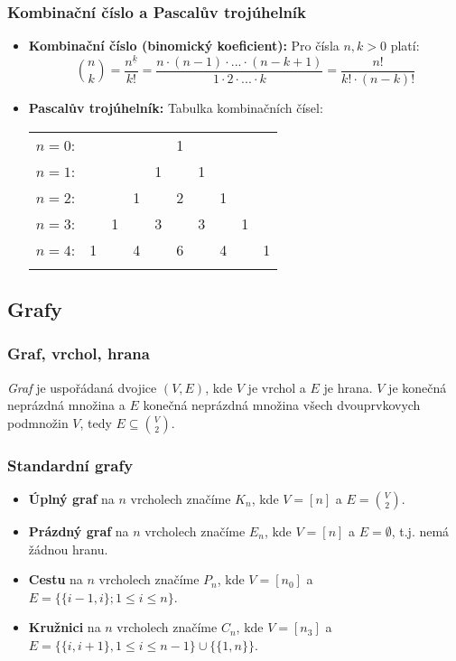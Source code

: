 \documentclass[10pt,a4paper]{article}
\begin{document}
\subsubsection{Kombinační číslo a Pascalův trojúhelník}
\begin{itemize}
    \item \textbf{Kombinační číslo (binomický koeficient):} Pro čísla $n,k > 0$ platí: 
    \[\binom nk = \frac{n^{\underline{k}}}{k!} = \frac{n\cdot (n-1) \cdot ... \cdot (n-k+1)}{1\cdot 2 \cdot ... \cdot k} = \frac{n!}{k! \cdot (n-k)!}\]
    \item \textbf{Pascalův trojúhelník:} Tabulka kombinačních čísel:
    \begin{center}
        \begin{tabular}{rccccccccc}
            $n=0$:&    &    &    &    &  1\\\noalign{\smallskip\smallskip}
            $n=1$:&    &    &    &  1 &    &  1\\\noalign{\smallskip\smallskip}
            $n=2$:&    &    &  1 &    &  2 &    &  1\\\noalign{\smallskip\smallskip}
            $n=3$:&    &  1 &    &  3 &    &  3 &    &  1\\\noalign{\smallskip\smallskip}
            $n=4$:&  1 &    &  4 &    &  6 &    &  4 &    &  1\\\noalign{\smallskip\smallskip}
        \end{tabular}
    \end{center}
\end{itemize}


\subsection{Grafy}

\subsubsection{Graf, vrchol, hrana}
\textit{Graf} je uspořádaná dvojice $(V, E)$, kde $V$ je vrchol a $E$ je hrana. $V$ je konečná neprázdná množina a $E$ konečná neprázdná množina všech dvouprvkovych podmnožin $V$, tedy $E \subseteq \binom{V}{2}$.

\subsubsection{Standardní grafy}

\begin{itemize}
    \item \textbf{Úplný graf} na $n$ vrcholech značíme $K_n$, kde $V = [n]$ a $E =\binom{V}{2}$.
    \item \textbf{Prázdný graf} na $n$ vrcholech značíme $E_n$, kde $V = [n]$ a $E = \emptyset$, t.j. nemá žádnou hranu.
    \item \textbf{Cestu} na $n$ vrcholech značíme $P_n$, kde $V = [n_0]$ a $E = \{\{i-1, i\}; 1\leq i \leq n\}$.
    \item \textbf{Kružnici} na $n$ vrcholech značíme $C_n$, kde $V = [n_3]$ a $E = \{\{i, i+1\}, 1\leq i\leq n-1\} \cup \{\{1, n\}\}$.
\end{itemize}
\end{document}
